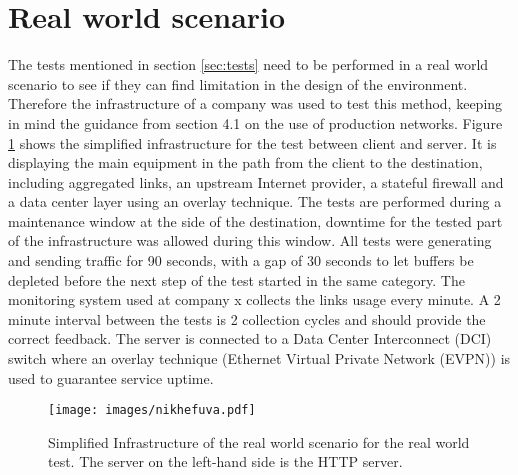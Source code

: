 \section{Real world scenario}
The tests mentioned in section \ref{sec:tests} need to be performed in a real world scenario to see if they can find limitation in the design of the environment. 
Therefore the infrastructure of a company was used to test this method, keeping in mind the guidance from section 4.1 on the use of production networks.
Figure \ref{fig:nikhefuva} shows the simplified infrastructure for the test between client and server.
It is displaying the main equipment in the path from the client to the destination, including aggregated links, an upstream Internet provider, a stateful firewall and a data center layer using an overlay technique.  
The tests are performed during a maintenance window at the side of the destination, downtime for the tested part of the infrastructure was allowed during this window. 
All tests were generating and sending traffic for 90 seconds, with a gap of 30 seconds to let buffers be depleted before the next step of the test started in the same category.
The monitoring system used at company x collects the links usage every minute. A 2 minute interval between the tests is 2 collection cycles and should provide the correct feedback. 
The server is connected to a Data Center Interconnect (DCI) switch where an overlay technique (Ethernet Virtual Private Network (EVPN)) is used to guarantee service uptime. 

\begin{figure}
  \texttt{[image: images/nikhefuva.pdf]}
  \caption{Simplified Infrastructure of the real world scenario for the real world test. The server on the left-hand side is the HTTP server.}
  \label{fig:nikhefuva}
\end{figure}

